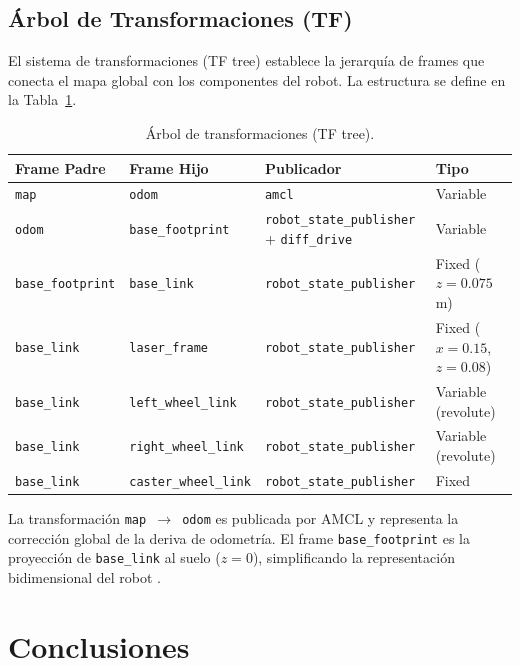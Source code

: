 \documentclass[12pt,letterpaper]{article}
\begin{document}
\subsection{Árbol de Transformaciones (TF)}

El sistema de transformaciones (TF tree) establece la jerarquía de frames que conecta el mapa global con los componentes del robot. La estructura se define en la Tabla~\ref{tab:tf_tree}.

\begin{table}[H]
    \centering
    \caption{Árbol de transformaciones (TF tree).}
    \label{tab:tf_tree}
    \begin{tabular}{llll}
        \hline
        \textbf{Frame Padre} & \textbf{Frame Hijo} & \textbf{Publicador} & \textbf{Tipo} \\
        \hline
        \texttt{map} & \texttt{odom} & \texttt{amcl} & Variable \\
        \texttt{odom} & \texttt{base\_footprint} & \texttt{robot\_state\_publisher} + \texttt{diff\_drive} & Variable \\
        \texttt{base\_footprint} & \texttt{base\_link} & \texttt{robot\_state\_publisher} & Fixed ($z=0.075$ m) \\
        \texttt{base\_link} & \texttt{laser\_frame} & \texttt{robot\_state\_publisher} & Fixed ($x=0.15$, $z=0.08$) \\
        \texttt{base\_link} & \texttt{left\_wheel\_link} & \texttt{robot\_state\_publisher} & Variable (revolute) \\
        \texttt{base\_link} & \texttt{right\_wheel\_link} & \texttt{robot\_state\_publisher} & Variable (revolute) \\
        \texttt{base\_link} & \texttt{caster\_wheel\_link} & \texttt{robot\_state\_publisher} & Fixed \\
        \hline
    \end{tabular}
\end{table}

La transformación \texttt{map $\rightarrow$ odom} es publicada por AMCL y representa la corrección global de la deriva de odometría. El frame \texttt{base\_footprint} es la proyección de \texttt{base\_link} al suelo ($z=0$), simplificando la representación bidimensional del robot \citep{marder2010office}.

\section{Conclusiones}
\label{sec:conclusiones}
\end{document}
